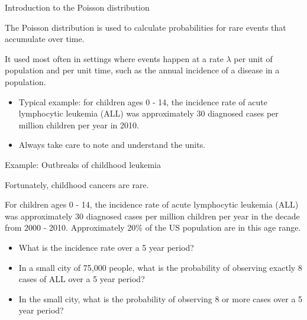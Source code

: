 \documentclass[ignorenonframetext,aspectratio=169]{beamer}
\providecommand{\tightlist}{%
  \setlength{\itemsep}{0pt}\setlength{\parskip}{0pt}}
\begin{document}
\begin{frame}{Introduction to the Poisson distribution}

The Poisson distribution is used to calculate probabilities for rare
events that accumulate over time.

It used most often in settings where events happen at a rate \(\lambda\)
per unit of population and per unit time, such as the annual incidence
of a disease in a population.

\begin{itemize}
\item
  Typical example: for children ages 0 - 14, the incidence rate of acute
  lymphocytic leukemia (ALL) was approximately 30 diagnosed cases per
  million children per year in 2010.
\item
  Always take care to note and understand the units.
\end{itemize}

\end{frame}

\begin{frame}{Example: Outbreaks of childhood leukemia}

Fortunately, childhood cancers are rare.

For children ages 0 - 14, the incidence rate of acute lymphocytic
leukemia (ALL) was approximately 30 diagnosed cases per million children
per year in the decade from 2000 - 2010. Approximately 20\% of the US
population are in this age range.

\begin{itemize}
\tightlist
\item
  What is the incidence rate over a 5 year period?
\item
  In a small city of 75,000 people, what is the probability of observing
  exactly 8 cases of ALL over a 5 year period?
\item
  In the small city, what is the probability of observing 8 or more
  cases over a 5 year period?
\end{itemize}

\end{frame}
\end{document}
